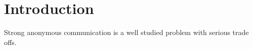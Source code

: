 
\section{Introduction}
Strong anonymous communication is a well studied problem with serious trade offs.